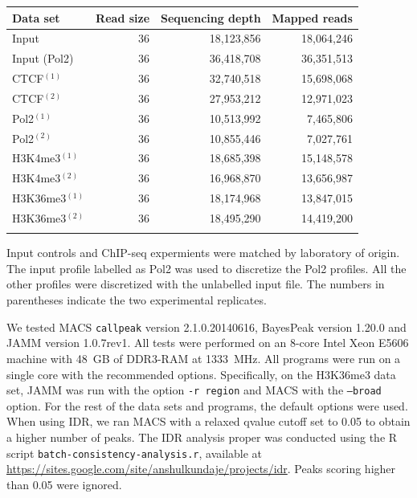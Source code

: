 \documentclass{bioinfo}
\begin{document}
\begin{methods}
\begin{table}[!tbp]
{\begin{tabular}{lrrr}
        \toprule
        \textbf{Data set} & \textbf{Read size} &
        \textbf{Sequencing depth} & \textbf{Mapped reads} \\
        \midrule
        Input            & 36 & 18,123,856 & 18,064,246 \\
        Input (Pol2)     & 36 & 36,418,708 & 36,351,513 \\
        CTCF$^{(1)}$     & 36 & 32,740,518 & 15,698,068 \\
        CTCF$^{(2)}$     & 36 & 27,953,212 & 12,971,023 \\
        Pol2$^{(1)}$     & 36 & 10,513,992 &  7,465,806 \\
        Pol2$^{(2)}$     & 36 & 10,855,446 &  7,027,761 \\
        H3K4me3$^{(1)}$  & 36 & 18,685,398 & 15,148,578 \\
        H3K4me3$^{(2)}$  & 36 & 16,968,870 & 13,656,987 \\
        H3K36me3$^{(1)}$ & 36 & 18,174,968 & 13,847,015 \\
        H3K36me3$^{(2)}$ & 36 & 18,495,290 & 14,419,200 \\
        \botrule
\end{tabular}}{Input controls and ChIP-seq expermients were matched
by laboratory of origin. The input profile labelled as Pol2 was used to
discretize the Pol2 profiles. All the other profiles were discretized
with the unlabelled input file.
The numbers in parentheses indicate the two experimental replicates.}
\end{table}

We tested MACS \texttt{callpeak} version 2.1.0.20140616, BayesPeak
version 1.20.0 and JAMM version 1.0.7rev1. All tests were performed on
an 8-core Intel Xeon E5606 machine with 48~GB of DDR3-RAM at 1333~MHz.
All programs were run on a single core with the recommended options.
Specifically, on the H3K36me3 data set, JAMM was run with the option
\texttt{-r region} and MACS with the \texttt{--broad} option. For the rest of
the data sets and programs, the default options were used.
When using IDR, we ran MACS with a relaxed qvalue cutoff set to 0.05
to obtain a higher number of peaks. The IDR analysis proper was conducted
using the R script \texttt{batch-consistency-analysis.r}, available at
\href{https://sites.google.com/site/anshulkundaje/projects/idr}{https://sites.google.com/site/anshulkundaje/projects/idr}.
Peaks scoring higher than 0.05 were ignored.


\end{methods}
\end{document}
